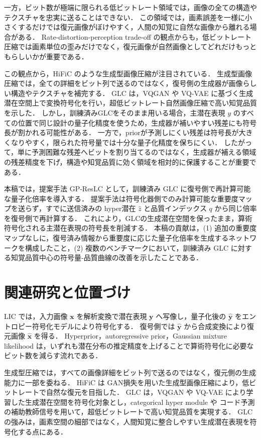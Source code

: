 \documentclass[MIRU,submit]{miru2026j}
\begin{document}
一方，ビット数が極端に限られる低ビットレート領域では，画像の全ての構造やテクスチャを忠実に送ることはできない．
この領域では，画素誤差を一様に小さくするだけでは復元画像がぼけやすく，人間の知覚に自然な画像から離れる場合がある．
Rate-distortion-perception trade-off の観点からも，低ビットレート圧縮では画素単位の歪みだけでなく，復元画像が自然画像としてどれだけもっともらしいかが重要である\cite{blau2019}．

この観点から，HiFiC のような生成型画像圧縮が注目されている\cite{mentzer2020}．
生成型画像圧縮では，全ての詳細をビット列で送るのではなく，復号側の生成器が画像らしい構造やテクスチャを補完する．
GLC は，VQGAN\cite{esser2021} や VQ-VAE\cite{oord2017} に基づく生成潜在空間上で変換符号化を行い，超低ビットレート自然画像圧縮で高い知覚品質を示した\cite{jia2024}．
しかし，訓練済みGLCをそのまま用いる場合，主潜在表現 $y$ のすべての位置で同じ設計の量子化精度を使うため，生成器が補いやすい残差にも符号長が割かれる可能性がある．
一方で，priorが予測しにくい残差は符号長が大きくなりやすく，限られた符号量では十分な量子化精度を保ちにくい．
したがって，単に予測困難な残差へビットを割り当てるのではなく，生成器が補える領域の残差精度を下げ，構造や知覚品質に効く領域を相対的に保護することが重要である．

本稿では，提案手法 GP-ResLC として，訓練済み GLC に復号側で再計算可能な量子化倍率を導入する．
提案手法は符号化器側でのみ計算可能な重要度マップを送らず，すでに送信済みの hyper潜在 $\hat{z}$ と品質インデックス $q$ から同じ倍率を復号側で再計算する．
これにより，GLCの生成潜在空間を保ったまま，算術符号化される主潜在表現の符号長を削減する．
本稿の貢献は，(1) 追加の重要度マップなしに，復号済み情報から重要度に応じた量子化倍率を生成するネットワークを構成したこと，(2) 複数のベンチマークにおいて，訓練済み GLC に対する知覚品質中心の符号量-品質曲線の改善を示したことである．

\section{関連研究と位置づけ}
LIC では，入力画像 $\mathbf{x}$ を解析変換で潜在表現 $\mathbf{y}$ へ写像し，量子化後の $\hat{\mathbf{y}}$ をエントロピー符号化モデルにより符号化する．
復号側では $\hat{\mathbf{y}}$ から合成変換により復元画像 $\hat{\mathbf{x}}$ を得る．
Hyperprior\cite{balle2018}，autoregressive prior\cite{minnen2018}，Gaussian mixture likelihood\cite{cheng2020} は，いずれも潜在分布の推定精度を上げることで算術符号化に必要なビット数を減らす流れである．

生成型圧縮では，すべての画像詳細をビット列で送るのではなく，復元側の生成能力に一部を委ねる．
HiFiC は GAN損失を用いた生成型画像圧縮により，低ビットレートで自然な復元を目指した\cite{mentzer2020}．
GLC は，VQGAN\cite{esser2021} や VQ-VAE\cite{oord2017} により学習した生成潜在空間を符号化対象とし，categorical hyper module や コード予測の補助教師信号を用いて，超低ビットレートで高い知覚品質を実現する\cite{jia2024}．
GLC の強みは，画素空間の細部ではなく，人間知覚に整合しやすい生成潜在表現を符号化する点にある．
\end{document}

